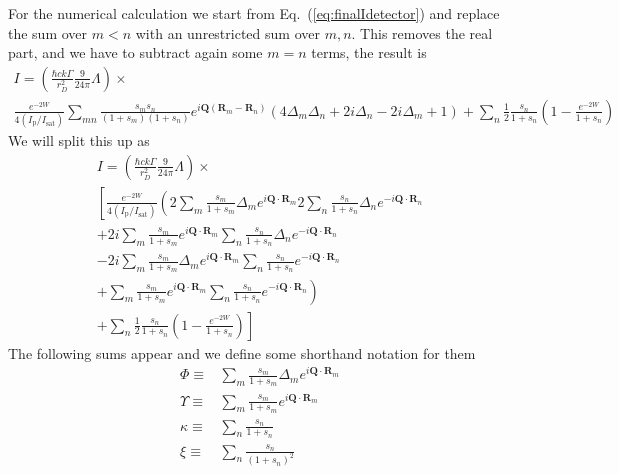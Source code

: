 \documentclass[11pt,letter]{article}
\newcommand{\bv}[1]{\ensuremath{\bm{#1}}}
\begin{document}
For the numerical calculation we start from Eq.~(\ref{eq:finalIdetector}) and replace the sum over $m<n$ with an unrestricted sum over $m,n$.  This removes the real part, and we have to subtract again some $m=n$ terms, the result is 
\begin{multline}
 I  =
 \left( 
 \frac{\hbar c k \Gamma}{r_{D}^{2}}  
     \frac{9}{24\pi} \Lambda 
  \right) \times \\
  \frac{ e^{-2W} }{ 4 (I_{\mathrm{p}}/I_{\mathrm{sat}})} \sum_{mn} 
    \frac{ s_{m} s_{n} } { ( 1+s_{m} )( 1+s_{n} ) }
               e^{ i \bv{Q}( \bv{R}_{m} - \bv{R}_{n} ) }
    \left(
        4 \Delta_{m} \Delta_{n}
      + 2 i \Delta_{n} 
      - 2 i \Delta_{m}
      + 1
    \right)  
  + \sum_{n}  \frac{1}{2}
    \frac{ s_{n} } { 1 + s_{n} } \left( 1 - \frac{e^{-2W}}{1+s_{n}} \right)
\end{multline}
We will split this up as 
\begin{multline}
 I  =
 \left( 
 \frac{\hbar c k \Gamma}{r_{D}^{2}}  
     \frac{9}{24\pi} \Lambda 
  \right) \times \\
  \left[
  \frac{ e^{-2W} }{ 4 (I_{\mathrm{p}}/I_{\mathrm{sat}})}
  \left( 
    2 \sum_{m}  
    \frac{ s_{m} }
         {  1 + s_{m} } \Delta_{m} e^{i\bv{Q}\cdot\bv{R}_{m} }
    2 \sum_{n} 
    \frac{ s_{n} }
         {  1 + s_{n} } \Delta_{n} e^{-i\bv{Q}\cdot\bv{R}_{n} }  \right. \right.\\
    + 2i\sum_{m}  
    \frac{ s_{m} }
         {  1 + s_{m} } e^{i\bv{Q}\cdot\bv{R}_{m} }
    \sum_{n} 
    \frac{ s_{n} }
         {  1 + s_{n} } \Delta_{n} e^{-i\bv{Q}\cdot\bv{R}_{n} }   \\
    - 2i\sum_{m}  
    \frac{ s_{m} }
         {  1 + s_{m} } \Delta_{m} e^{i\bv{Q}\cdot\bv{R}_{m} }
    \sum_{n} 
    \frac{ s_{n} }
         {  1 + s_{n} } e^{-i\bv{Q}\cdot\bv{R}_{n} }   \\
    \left.
    +\sum_{m}  
    \frac{ s_{m} }
         {  1 + s_{m} } e^{i\bv{Q}\cdot\bv{R}_{m} }
    \sum_{n} 
    \frac{ s_{n} }
         {  1 + s_{n} } e^{-i\bv{Q}\cdot\bv{R}_{n} }  \right) \\
   \left.
  + \sum_{n}  \frac{1}{2}
    \frac{ s_{n} } { 1 + s_{n} } \left( 1 - \frac{e^{-2W}}{1+s_{n}} \right) \right]
\end{multline}
The following sums appear and we define some shorthand notation for them
\begin{align} 
     \Phi \equiv & 
     \sum_{m}  
    \frac{ s_{m} }
         {  1 + s_{m} } \Delta_{m} e^{i\bv{Q}\cdot\bv{R}_{m} } \\
     \Upsilon \equiv &
     \sum_{m}  
    \frac{ s_{m} }
         {  1 + s_{m} } e^{i\bv{Q}\cdot\bv{R}_{m} } \\
     \kappa \equiv & 
     \sum_{n}  
     \frac{ s_{n} } { 1 + s_{n} }  \\
     \xi \equiv & 
     \sum_{n}  
     \frac{ s_{n} } { (1 + s_{n})^{2}}  \\
\end{align}
\end{document}
